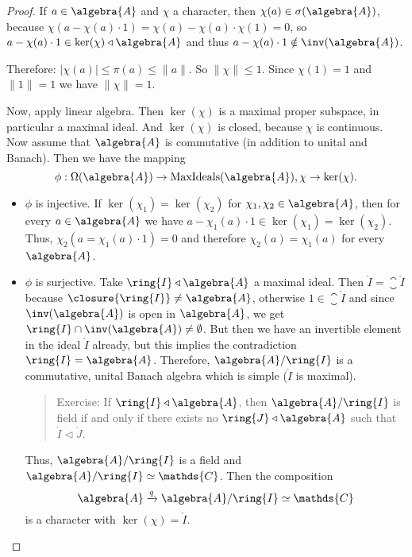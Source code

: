 \documentclass[a4paper]{article}
\begin{document}
\begin{proof}
	If $a \in \algebra{A}$ and $\chi$ a character, then $\chi(a) \in \sigma(\algebra{A})$, because $\chi(a - \chi(a) \cdot 1) = \chi(a) - \chi(a) \cdot \chi(1) = 0$, so $a - \chi(a) \cdot 1 \in \ker(\chi) \triangleleft \algebra{A}$ and thus $a - \chi(a) \cdot 1 \notin \inv(\algebra{A})$.

	Therefore: $|\chi(a)| \leq \pi(a) \leq \|a\|$. So $\|\chi\| \leq 1$. Since $\chi(1) = 1$ and $\|1\| = 1$ we have $\|\chi\| = 1$.

	Now, apply linear algebra. Then $\ker (\chi)$ is a maximal proper subspace, in particular a maximal ideal.
	And $\ker(\chi)$ is closed, because $\chi$ is continuous.
	Now assume that $\algebra{A}$ is commutative (in addition to unital and Banach).
	Then we have the mapping
	\begin{equation*}
		\phi: \Omega(\algebra{A}) \to \mathrm{MaxIdeals}(\algebra{A}), \chi \to \ker(\chi)\text{.}
	\end{equation*}
	\begin{itemize}
		\item $\phi$ is injective.
		      If $\ker(\chi_1) = \ker(\chi_2)$ for $\chi_1, \chi_2 \in \algebra{A}$, then for every $a \in \algebra{A}$ we have $a - \chi_1(a) \cdot 1 \in \ker(\chi_1) =\ker(\chi_2)$.
		      Thus, $\chi_2(a = \chi_1(a) \cdot 1) = 0$ and therefore $\chi_2(a) = \chi_1(a)$ for every $\algebra{A}$.
		\item $\phi$ is surjective.
		      Take $\ring{I} \triangleleft  \algebra{A}$ a maximal ideal.
		      Then $\ring{I} = \closure{\ring{I}}$ because $\closure{\ring{I}} \neq \algebra{A}$, otherwise $1 \in \closure{\ring{I}}$ and since $\inv(\algebra{A})$ is open in $\algebra{A}$, we get $\ring{I} \cap \inv(\algebra{A}) \neq \emptyset$.
		      But then we have an invertible element in the ideal $\ring{I}$ already, but this implies the contradiction $\ring{I} = \algebra{A}$.
		      Therefore, $\algebra{A} / \ring{I}$ is a commutative, unital Banach algebra which is simple ($\ring{I}$ is maximal).
		      \begin{quote}
			      Exercise: If $\ring{I} \triangleleft \algebra{A}$, then $\algebra{A} / \ring{I}$ is field if and only if there exists no $\ring{J} \triangleleft \algebra{A}$ such that $\ring{I} \triangleleft \ring{J}$.
		      \end{quote}
		      Thus, $\algebra{A} / \ring{I}$ is a field and $\algebra{A} / \ring{I} \simeq \mathds{C}$.
		      Then the composition
		      \begin{equation*}
			      \algebra{A} \xrightarrow{q} \algebra{A} / \ring{I} \simeq \mathds{C}
		      \end{equation*}
		      is a character with $ \ker(\chi) = \ring{I}$.
	\end{itemize}
\end{proof}
\end{document}
